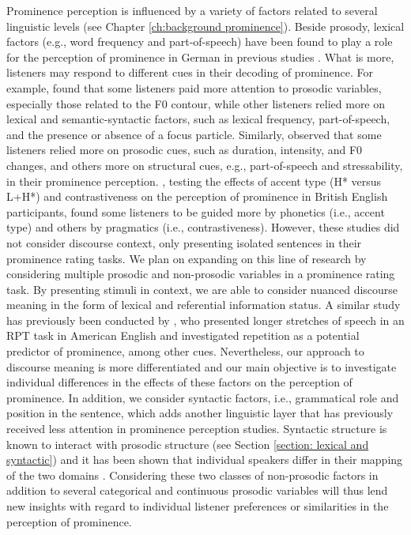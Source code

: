 Prominence perception is influenced by a variety of factors related to several linguistic levels (see Chapter \ref{ch:background prominence}). Beside prosody, lexical factors (e.g., word frequency and part-of-speech) have been found to play a role for the perception of prominence in German in previous studies \citep[e.g.,][]{baumannWhatMakesWord2018, wagnerExploitingSpeechgestureLink2019}. What is more, listeners may respond to different cues in their decoding of prominence. For example, \citet{baumannWhatMakesWord2018} found that some listeners paid more attention to prosodic variables, especially those related to the F0 contour, while other listeners relied more on lexical and semantic-syntactic factors, such as lexical frequency, part-of-speech, and the presence or absence of a focus particle. Similarly, \citet{wagnerExploitingSpeechgestureLink2019} observed that some listeners relied more on prosodic cues, such as duration, intensity, and F0 changes, and others more on structural cues, e.g., part-of-speech and stressability, in their prominence perception. \citet{orricoInfluenceEmpathyAutisticlike2023}, testing the effects of accent type (H* versus L+H*) and contrastiveness on the perception of prominence in British English participants, found some listeners to be guided more by phonetics (i.e., accent type) and others by pragmatics (i.e., contrastiveness). However, these studies did not consider discourse context, only presenting isolated sentences in their prominence rating tasks. We plan on expanding on this line of research by considering multiple prosodic and non-prosodic variables in a prominence rating task. By presenting stimuli in context, we are able to consider nuanced discourse meaning in the form of lexical and referential information status. A similar study has previously been conducted by \citet{coleSignalbasedExpectationbasedFactors2010}, who presented longer stretches of speech in an RPT task in American English and investigated repetition as a potential predictor of prominence, among other cues. Nevertheless, our approach to discourse meaning is more differentiated and our main objective is to investigate individual differences in the effects of these factors on the perception of prominence. In addition, we consider syntactic factors, i.e., grammatical role and position in the sentence, which adds another linguistic layer that has previously received less attention in prominence perception studies. Syntactic structure is known to interact with prosodic structure (see Section \ref{section: lexical and syntactic}) and it has been shown that individual speakers differ in their mapping of the two domains \citep{huttenlauchIndividualVariabilityProsodic2022}. Considering these two classes of non-prosodic factors in addition to several categorical and continuous prosodic variables will thus lend new insights with regard to individual listener preferences or similarities in the perception of prominence.


